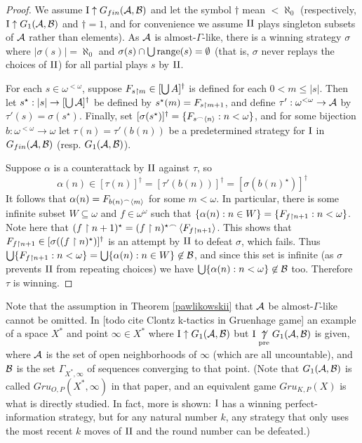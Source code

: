 \documentclass{amsart}
\theoremstyle{plain}
\theoremstyle{definition}
\theoremstyle{remark}
\theoremstyle{plain}
\theoremstyle{definition}
\theoremstyle{remark}
\begin{document}
\begin{proof}
We assume \(\mathrm{I}\uparrow G_{fin}(\mathcal{A},\mathcal{B})\)
and let the symbol \(\dagger\) mean \(<\aleph_0\)
(respectively, \(\mathrm{I}\uparrow G_1(\mathcal{A},\mathcal{B})\)
and \(\dagger=1\),
and for convenience we assume \(\mathrm{II}\) plays
singleton subsets of \(\mathcal{A}\) rather than elements).
As \(\mathcal{A}\) is almost-\(\Gamma\)-like, there is a 
winning strategy \(\sigma\) where
\(|\sigma(s)|=\aleph_0\) and \(\sigma(s)\cap\bigcup\text{range}(s)=\emptyset\)
(that is, \(\sigma\) never replays the choices of \(\mathrm{II}\))
for all partial plays \(s\) by \(\mathrm{II}\).

For each \(s\in\omega^{<\omega}\), suppose 
\(F_{s\restriction m}\in[\bigcup A]^{\dagger}\) 
is defined for each \(0<m\leq|s|\).
Then let \(s^\star:|s|\to[\bigcup\mathcal{A}]^{\dagger}\)
be defined by
\(s^\star(m)=F_{s\restriction m+1}\), and define \(\tau':\omega^{<\omega}\to\mathcal{A}\)
by \(\tau'(s)=\sigma(s^\star)\). Finally, set 
\([\sigma(s^\star)]^{\dagger}=\{F_{s{^\frown}\left\langle n\right\rangle}:n<\omega\}\), and
for some bijection \(b:\omega^{<\omega}\to\omega\) let \(\tau(n)=\tau'(b(n))\)
be a predetermined strategy for \(\mathrm{I}\) in \(G_{fin}(\mathcal{A},\mathcal{B})\)
(resp. \(G_1(\mathcal{A},\mathcal{B})\)).

Suppose \(\alpha\) is a counterattack by \(\mathrm{II}\) against \(\tau\), so 
\[
  \alpha(n)
    \in
  [\tau(n)]^{\dagger}
    =
  [\tau'(b(n))]^{\dagger}
    =
  [\sigma(b(n)^\star)]^{\dagger}
\]
It follows that \(\alpha(n)=F_{b(n){^\frown}\left\langle m\right\rangle}\) for some \(m<\omega\).
In particular, there is some infinite subset \(W\subseteq\omega\) and \(f\in\omega^\omega\)
such that \(\{\alpha(n):n\in W\}=\{F_{f\restriction n+1}:n<\omega\}\).
Note here that \((f\restriction n+1)^\star=(f\restriction n)^\star{^\frown}\left\langle F_{f\restriction n+1}\right\rangle\).
This shows that \(F_{f\restriction n+1}\in[\sigma((f\restriction n)^\star)]^{\dagger}\) 
is an attempt by \(\mathrm{II}\) to defeat \(\sigma\), which fails. Thus 
\(\bigcup\{F_{f\restriction n+1}:n<\omega\}=\bigcup\{\alpha(n):n\in W\}\not\in\mathcal{B}\),
and since this set is infinite (as \(\sigma\) prevents \(\mathrm{II}\)
from repeating choices) we have \(\bigcup\{\alpha(n):n<\omega\}\not\in\mathcal{B}\) too.
Therefore \(\tau\) is winning.
\end{proof}

Note that the assumption in Theorem \ref{pawlikowskii} that \(\mathcal{A}\)
be almost-\(\Gamma\)-like cannot be omitted. In
[todo cite Clontz k-tactics in Gruenhage game]
an example of a space \(X^*\) and point \(\infty\in X^*\) 
where \(\mathrm{I}\uparrow G_1(\mathcal{A},\mathcal{B})\) but
\(\mathrm{I}\underset{\text{pre}}{\not\uparrow} G_1(\mathcal{A},\mathcal{B})\) is given, where \(\mathcal{A}\) is
the set of open neighborhoods of \(\infty\) 
(which are all uncountable), 
and \(\mathcal{B}\) is the set \(\Gamma_{X^*,\infty}\) of sequences converging to that point.
(Note that \(G_1(\mathcal{A},\mathcal{B})\) is called \(Gru_{O,P}(X^*,\infty)\) in that
paper, and an equivalent game \(Gru_{K,P}(X)\) is what is directly
studied. In fact, more is shown: \(\mathrm{I}\) has a winning perfect-information
strategy, but for any natural number \(k\), any strategy that only uses 
the most recent \(k\) moves of \(\mathrm{II}\) and the round number
can be defeated.)
\end{document}
